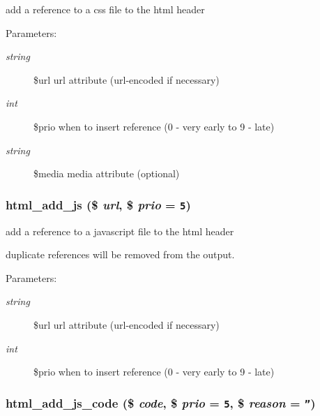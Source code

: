 add a reference to a css file to the html header

\begin{Desc}
\item[Parameters:]
\begin{description}
\item[{\em string}]\$url url attribute (url-encoded if necessary) \item[{\em int}]\$prio when to insert reference (0 - very early to 9 - late) \item[{\em string}]\$media media attribute (optional) \end{description}
\end{Desc}
\hypertarget{html_8inc_8php_450214704e1bbc2e8849abb54db38a03}{
\subsubsection[{html\_\-add\_\-js}]{\setlength{\rightskip}{0pt plus 5cm}html\_\-add\_\-js (\$ {\em url}, \/  \$ {\em prio} = {\tt 5})}}
\label{html_8inc_8php_450214704e1bbc2e8849abb54db38a03}


add a reference to a javascript file to the html header

duplicate references will be removed from the output. \begin{Desc}
\item[Parameters:]
\begin{description}
\item[{\em string}]\$url url attribute (url-encoded if necessary) \item[{\em int}]\$prio when to insert reference (0 - very early to 9 - late) \end{description}
\end{Desc}
\hypertarget{html_8inc_8php_90601d141e5751c07b61f32f623ed7d2}{
\subsubsection[{html\_\-add\_\-js\_\-code}]{\setlength{\rightskip}{0pt plus 5cm}html\_\-add\_\-js\_\-code (\$ {\em code}, \/  \$ {\em prio} = {\tt 5}, \/  \$ {\em reason} = {\tt ''})}}
\label{html_8inc_8php_90601d141e5751c07b61f32f623ed7d2}


